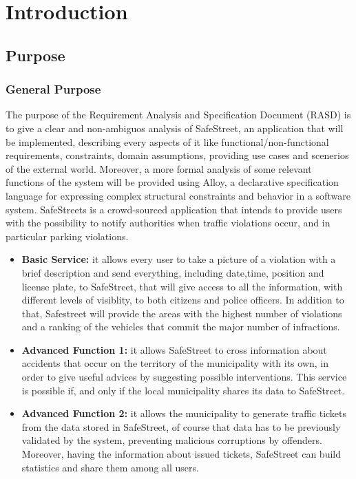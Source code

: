 \documentclass[../RASD.tex]{subfiles}
\begin{document}
    \chapter{Introduction}\label{ch:introduction}
    \section{Purpose}\label{sec:purpose}
        \subsection{General Purpose}\label{subsec:general-purpose}
        The purpose of the Requirement Analysis and Specification Document (RASD) is to give a clear and non-ambiguos analysis of SafeStreet, an application that will be implemented, describing every aspects of it like functional/non-functional requirements, constraints, domain assumptions, providing use cases and scenerios of the external world. Moreover, a more formal analysis of some relevant functions of the system will be provided using Alloy, a declarative specification language for expressing complex structural constraints and behavior in a software system.
        SafeStreets is a crowd-sourced application that intends to provide users with the possibility to notify authorities when traffic violations occur, and in particular parking violations.
        \begin{itemize}
            \item \textbf{Basic Service:}
            it allows every user to take a picture of a violation with a brief description and send everything, including date,time, position and license plate, to SafeStreet, that will give access to all the information, with different levels of visiblity, to both citizens and police officers. In addition to that, Safestreet will provide the areas with the highest number of violations and a ranking of the vehicles that commit the major number of infractions.
            \item \textbf{Advanced Function 1:}
            it allows SafeStreet to cross information about accidents that occur on the territory of the municipality with its own, in order to give useful advices by suggesting possible interventions. This service is possible if, and only if the local municipality shares its data to SafeStreet.
            \item \textbf{Advanced Function 2:}
            it allows the municipality to generate traffic tickets from the data stored in SafeStreet, of course that data has to be previously validated by the system, preventing malicious corruptions by offenders. Moreover, having the information about issued tickets, SafeStreet can build statistics and share them among all users.
        \end{itemize}
\end{document}

